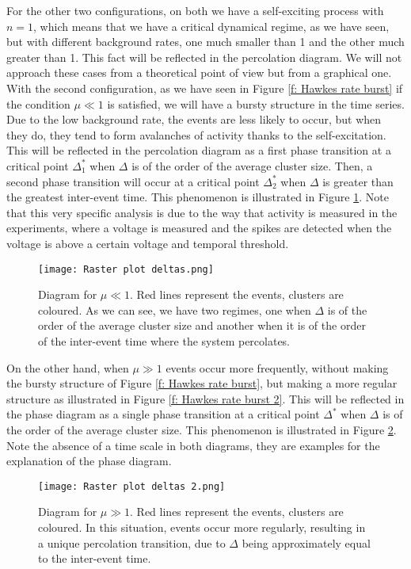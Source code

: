 For the other two configurations, on both we have a self-exciting process with $n=1$, which means that we have a critical dynamical regime, as we have seen, but with different background 
rates, one much smaller than 1 and the other much greater than 1. This fact will be reflected in the percolation diagram. We will not approach these cases from a theoretical point of view
but from a graphical one. With the second configuration, as we have seen in Figure \ref{f: Hawkes rate burst} if the condition $\mu\ll 1$ is satisfied, we will have a bursty structure in the 
time series. Due to the low background rate, the events are less likely to occur, but when they do, they tend to form avalanches of activity thanks to the self-excitation. This will be
reflected in the percolation diagram as a first phase transition at a critical point $\Delta^*_1$ when $\Delta$ is of the order of the average cluster size. Then, a second phase transition
will occur at a critical point $\Delta^*_2$ when $\Delta$ is greater than the greatest inter-event time. This phenomenon is illustrated in Figure \ref{f: Delta percolación}.
Note that this very specific analysis is due to the way that activity is measured in the experiments, where a voltage is measured and the spikes are detected when the voltage is above a
certain voltage and temporal threshold. 

\begin{figure}[H]
    \centering
    \texttt{[image: Raster plot deltas.png]}
    \caption{Diagram for $\mu\ll 1$. Red lines represent the events, clusters are coloured. As we can see, we have two regimes, one when $\Delta$ is of the order of the average 
    cluster size and another when it is of the order of the inter-event time where the system percolates.}
    \label{f: Delta percolación}
\end{figure}

On the other hand, when $\mu\gg 1$ events occur more frequently, without making the bursty structure of Figure \ref{f: Hawkes rate burst}, but making a more regular structure as
illustrated in Figure \ref{f: Hawkes rate burst 2}. This will be reflected in the phase diagram as a single phase transition at a critical point $\Delta^*$ when $\Delta$ is of the order of
the average cluster size. This phenomenon is illustrated in Figure \ref{f: Delta percolación 2}. Note the absence of a time scale in both diagrams, they are examples for the explanation of 
the phase diagram.

\begin{figure}[H]
    \centering
    \texttt{[image: Raster plot deltas 2.png]}
    \caption{Diagram for $\mu\gg1$. Red lines represent the events, clusters are coloured. In this situation, events occur more regularly, resulting in a unique percolation transition, 
    due to $\Delta$ being approximately equal to the inter-event time.}
    \label{f: Delta percolación 2}
\end{figure}